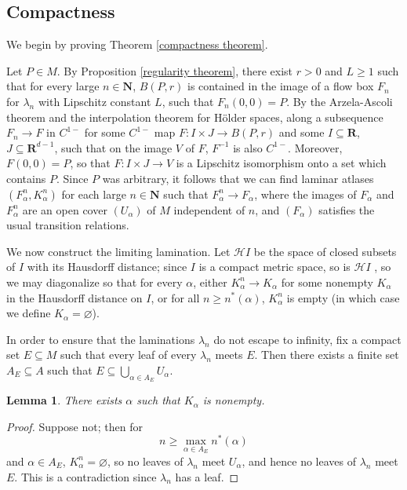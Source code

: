 \documentclass[final,12pt, leqno]{brownthesis}
\let\emptyset\varnothing
\newcommand{\NN}{\mathbf{N}}
\newcommand{\RR}{\mathbf{R}}
\newcommand{\Hypspace}{\mathscr H}
\newtheorem{lemma}[theorem]{Lemma}
\theoremstyle{definition}
\numberwithin{equation}{section}
\begin{document}
\subsection{Compactness}
We begin by proving Theorem \ref{compactness theorem}.

Let $P \in M$.
By Proposition \ref{regularity theorem}, there exist $r > 0$ and $L \geq 1$ such that for every large $n \in \NN$, $B(P, r)$ is contained in the image of a flow box $F_n$ for $\lambda_n$ with Lipschitz constant $L$, such that $F_n(0, 0) = P$.
By the Arzela-Ascoli theorem and the interpolation theorem for H\"older spaces, along a subsequence $F_n \to F$ in $C^{1-}$ for some $C^{1-}$ map $F: I \times J \to B(P, r)$ and some $I \subseteq \RR$, $J \subseteq \RR^{d - 1}$, such that on the image $V$ of $F$, $F^{-1}$ is also $C^{1-}$.
Moreover, $F(0, 0) = P$, so that $F: I \times J \to V$ is a Lipschitz isomorphism onto a set which contains $P$.
Since $P$ was arbitrary, it follows that we can find laminar atlases $(F_\alpha^n, K_\alpha^n)$ for each large $n \in \NN$ such that $F_\alpha^n \to F_\alpha$, where the images of $F_\alpha$ and $F_\alpha^n$ are an open cover $(U_\alpha)$ of $M$ independent of $n$, and $(F_\alpha)$ satisfies the usual transition relations.

We now construct the limiting lamination.
Let $\Hypspace I$ be the space of closed subsets of $I$ with its Hausdorff distance; since $I$ is a compact metric space, so is $\Hypspace I$ \cite[Theorem 4.17]{nadler2017continuum}, so we may diagonalize so that for every $\alpha$, either $K^n_\alpha \to K_\alpha$ for some nonempty $K_\alpha$ in the Hausdorff distance on $I$, or for all $n \geq n^*(\alpha)$, $K_\alpha^n$ is empty (in which case we define $K_\alpha = \emptyset$).

In order to ensure that the laminations $\lambda_n$ do not escape to infinity, fix a compact set $E \subseteq M$ such that every leaf of every $\lambda_n$ meets $E$.
Then there exists a finite set $A_E \subseteq A$ such that $E \subseteq \bigcup_{\alpha \in A_E} U_\alpha$.

\begin{lemma}\label{label sets are nonempty}
	There exists $\alpha$ such that $K_\alpha$ is nonempty.
\end{lemma}
\begin{proof}
	Suppose not; then for
	$$n \geq \max_{\alpha \in A_E} n^*(\alpha)$$
	and $\alpha \in A_E$, $K_\alpha^n = \emptyset$, so no leaves of $\lambda_n$ meet $U_\alpha$, and hence no leaves of $\lambda_n$ meet $E$.
	This is a contradiction since $\lambda_n$ has a leaf.
\end{proof}
\end{document}
